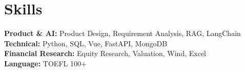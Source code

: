 \documentclass{article}
\begin{document}
\section{Skills}
\begin{itemize}[leftmargin=0in, label={}, itemsep=1pt, topsep=2pt]
\small{\item{
\textbf{Product \& AI:} Product Design, Requirement Analysis, RAG, LangChain \\
\textbf{Technical:} Python, SQL, Vue, FastAPI, MongoDB \\
\textbf{Financial Research:} Equity Research, Valuation, Wind, Excel \\
\textbf{Language:} TOEFL 100+
}}
\end{itemize}
\end{document}
